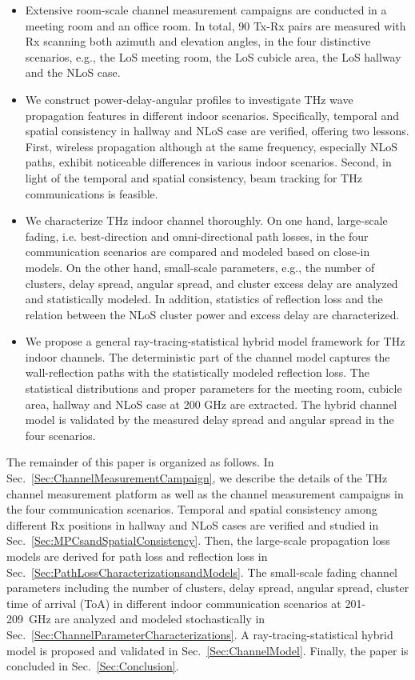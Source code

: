\documentclass[journal,12pt,draftclsnofoot,onecolumn]{IEEEtran}
\begin{document}
\begin{itemize}
    \item Extensive room-scale channel measurement campaigns are conducted in a meeting room and an office room. In total, 90 Tx-Rx pairs are measured with Rx scanning both azimuth and elevation angles, in the four distinctive scenarios, e.g., the LoS meeting room, the LoS cubicle area, the LoS hallway and the NLoS case. 
    \item We construct power-delay-angular profiles to investigate THz wave propagation features in different indoor scenarios. Specifically, temporal and spatial consistency in hallway and NLoS case are verified, offering two lessons. First, wireless propagation although at the same frequency, especially NLoS paths, exhibit noticeable differences in various indoor scenarios. Second, in light of the temporal and spatial consistency, beam tracking for THz communications is feasible.
    \item We characterize THz indoor channel thoroughly. On one hand, large-scale fading, i.e. best-direction and omni-directional path losses, in the four communication scenarios are compared and modeled based on close-in models. On the other hand, small-scale parameters, e.g., the number of clusters, delay spread, angular spread, and cluster excess delay are analyzed and statistically modeled. In addition, statistics of reflection loss and the relation between the NLoS cluster power and excess delay are characterized.
    \item We propose a general ray-tracing-statistical hybrid model framework for THz indoor channels. The deterministic part of the channel model captures the wall-reflection paths with the statistically modeled reflection loss. The statistical distributions and proper parameters for the meeting room, cubicle area, hallway and NLoS case at 200 GHz are extracted. The hybrid channel model is validated by the measured delay spread and angular spread in the four scenarios.
\end{itemize}
\par The remainder of this paper is organized as follows. In Sec.~\ref{Sec:ChannelMeasurementCampaign}, we describe the details of the THz channel measurement platform as well as the channel measurement campaigns in the four communication scenarios. Temporal and spatial consistency among different Rx positions in hallway and NLoS cases are verified and studied in Sec.~\ref{Sec:MPCsandSpatialConsistency}. Then, the large-scale propagation loss models are derived for path loss and reflection loss in Sec.~\ref{Sec:PathLossCharacterizationsandModels}. The small-scale fading channel parameters including the number of clusters, delay spread, angular spread, cluster time of arrival (ToA) in different indoor communication scenarios at 201-209~GHz are analyzed and modeled stochastically in Sec.~\ref{Sec:ChannelParameterCharacterizations}. A ray-tracing-statistical hybrid model is proposed and validated in Sec.~\ref{Sec:ChannelModel}. Finally, the paper is concluded in Sec.~\ref{Sec:Conclusion}.
\end{document}
